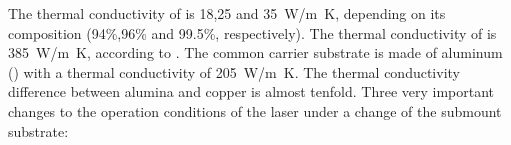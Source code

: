 


The thermal conductivity of  is 18,25 and \SI{35}{\watt/\meter\kelvin}, depending on its composition (94\%,96\% and 99.5\%, respectively). The thermal conductivity of  is \SI{385}{\watt/\meter\kelvin}, according to \cite{TempYoung92}. The common carrier substrate is made of aluminum () with a thermal conductivity of \SI{205}{\watt/\meter\kelvin}. The thermal conductivity difference between alumina and copper is almost tenfold. Three very important changes to the operation conditions of the laser under a change of the submount substrate: %





